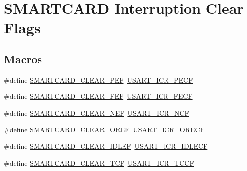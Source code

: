 \hypertarget{group___s_m_a_r_t_c_a_r_d___i_t___c_l_e_a_r___flags}{}\section{S\+M\+A\+R\+T\+C\+A\+RD Interruption Clear Flags}
\label{group___s_m_a_r_t_c_a_r_d___i_t___c_l_e_a_r___flags}
\subsection*{Macros}
\begin{DoxyCompactItemize}
\item 
\#define \hyperlink{group___s_m_a_r_t_c_a_r_d___i_t___c_l_e_a_r___flags_gad589617040e5f426122a23364c377da2}{S\+M\+A\+R\+T\+C\+A\+R\+D\+\_\+\+C\+L\+E\+A\+R\+\_\+\+P\+EF}~\hyperlink{group___peripheral___registers___bits___definition_ga404185136eb68f679e82e0187d66e411}{U\+S\+A\+R\+T\+\_\+\+I\+C\+R\+\_\+\+P\+E\+CF}
\item 
\#define \hyperlink{group___s_m_a_r_t_c_a_r_d___i_t___c_l_e_a_r___flags_ga3aa5dfa08809a2c1e8cb9f44d3132cc5}{S\+M\+A\+R\+T\+C\+A\+R\+D\+\_\+\+C\+L\+E\+A\+R\+\_\+\+F\+EF}~\hyperlink{group___peripheral___registers___bits___definition_ga8400b4500c41800e5f18fc7291a64c9f}{U\+S\+A\+R\+T\+\_\+\+I\+C\+R\+\_\+\+F\+E\+CF}
\item 
\#define \hyperlink{group___s_m_a_r_t_c_a_r_d___i_t___c_l_e_a_r___flags_gad462b01ea8cec6eee50e467cec74d864}{S\+M\+A\+R\+T\+C\+A\+R\+D\+\_\+\+C\+L\+E\+A\+R\+\_\+\+N\+EF}~\hyperlink{group___peripheral___registers___bits___definition_gad50b0d2460df1cbddd9576c2f4637312}{U\+S\+A\+R\+T\+\_\+\+I\+C\+R\+\_\+\+N\+CF}
\item 
\#define \hyperlink{group___s_m_a_r_t_c_a_r_d___i_t___c_l_e_a_r___flags_ga8ea1dbe61667748016c1d54bb7192f3f}{S\+M\+A\+R\+T\+C\+A\+R\+D\+\_\+\+C\+L\+E\+A\+R\+\_\+\+O\+R\+EF}~\hyperlink{group___peripheral___registers___bits___definition_ga375f76b0670ffeb5d2691592d9e7c422}{U\+S\+A\+R\+T\+\_\+\+I\+C\+R\+\_\+\+O\+R\+E\+CF}
\item 
\#define \hyperlink{group___s_m_a_r_t_c_a_r_d___i_t___c_l_e_a_r___flags_ga2f66ef3a43399ba852140a257472f3a1}{S\+M\+A\+R\+T\+C\+A\+R\+D\+\_\+\+C\+L\+E\+A\+R\+\_\+\+I\+D\+L\+EF}~\hyperlink{group___peripheral___registers___bits___definition_ga9d4d7675c0d36ce4347c3509d27c0760}{U\+S\+A\+R\+T\+\_\+\+I\+C\+R\+\_\+\+I\+D\+L\+E\+CF}
\item 
\#define \hyperlink{group___s_m_a_r_t_c_a_r_d___i_t___c_l_e_a_r___flags_gad402907f3dc6986bf059ccaa96d27046}{S\+M\+A\+R\+T\+C\+A\+R\+D\+\_\+\+C\+L\+E\+A\+R\+\_\+\+T\+CF}~\hyperlink{group___peripheral___registers___bits___definition_gacf92ea54425a962dde662b10b61d0250}{U\+S\+A\+R\+T\+\_\+\+I\+C\+R\+\_\+\+T\+C\+CF}

\end{DoxyCompactItemize}
